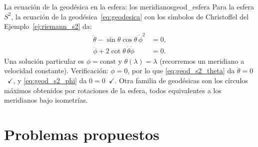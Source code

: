\begin{ejemplo}{La ecuación de la geodésica en la esfera: los meridianos}{geod_esfera}
Para la esfera $S^2$, la ecuación de la geodésica~\eqref{eq:geodesica} con los símbolos de Christoffel del Ejemplo~\ref{ej:riemann_s2} da:
\begin{align}
  \ddot{\theta} - \sin\theta\cos\theta\, \dot{\phi}^2 &= 0, \label{eq:geod_s2_theta}\\
  \ddot{\phi} + 2\cot\theta\, \dot{\theta}\dot{\phi} &= 0. \label{eq:geod_s2_phi}
\end{align}
Una solución particular es $\phi = \text{const}$ y $\theta(\lambda) = \lambda$ (recorremos un meridiano a velocidad constante). Verificación: $\dot{\phi} = 0$, por lo que \eqref{eq:geod_s2_theta} da $\ddot{\theta} = 0$~$\checkmark$, y \eqref{eq:geod_s2_phi} da $0 = 0$~$\checkmark$. Otra familia de geodésicas son los círculos máximos obtenidos por rotaciones de la esfera, todos equivalentes a los meridianos bajo isometrías.
\end{ejemplo}

\section{Problemas propuestos}

